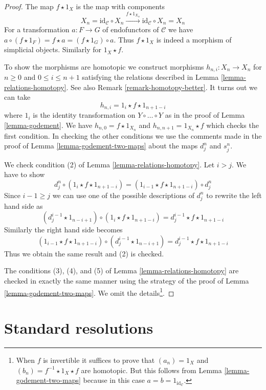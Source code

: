 \begin{proof}
The map $f \star 1_X$ is the map with components
$$
X_n = \text{id}_\mathcal{C} \circ X_n
\xrightarrow{f \star 1_{X_n}}
\text{id}_\mathcal{C} \circ X_n = X_n
$$
For a transformation $a : F \to G$ of endofunctors of $\mathcal{C}$ we have
$a \circ (f \star 1_F) = f \star a = (f \star 1_G) \circ a$. Thus $f \star 1_X$
is indeed a morphism of simplicial objects. Similarly for $1_X \star f$.

\medskip\noindent
To show the morphisms are homotopic we construct
morphisms $h_{n, i} : X_n \to X_n$ for $n \geq 0$ and $0 \leq i \leq n + 1$
satisfying the relations described in Lemma \ref{lemma-relations-homotopy}.
See also Remark \ref{remark-homotopy-better}. It turns out we can take
$$
h_{n, i} = 1_i \star f \star 1_{n + 1 - i}
$$
where $1_i$ is the identity transformation on $Y \circ \ldots \circ Y$
as in the proof of Lemma \ref{lemma-godement}. We have
$h_{n, 0} = f \star 1_{X_n}$ and $h_{n, n + 1} = 1_{X_n} \star f$
which checks the first condition. In checking the other conditions
we use the comments made in the proof of
Lemma \ref{lemma-godement-two-maps} about the maps $d^n_j$ and $s^n_j$.

\medskip\noindent
We check condition (2) of Lemma \ref{lemma-relations-homotopy}.
Let $i > j$. We have to show
$$
d^n_j \circ (1_i \star f \star 1_{n + 1 - i}) =
(1_{i - 1} \star f \star 1_{n + 1 - i}) \circ d^n_j
$$
Since $i - 1 \geq j$ we can use one of the possible descriptions of
$d^n_j$ to rewrite the left hand side as
$$
(d^{i - 1}_j \star 1_{n - i + 1}) \circ (1_i \star f \star 1_{n + 1 - i}) =
d^{i - 1}_j \star f \star 1_{n + 1 - i}
$$
Similarly the right hand side becomes
$$
(1_{i - 1} \star f \star 1_{n + 1 - i}) \circ
(d^{i - 1}_j \star 1_{n - i + 1}) =
d^{i - 1}_j \star f \star 1_{n + 1 - i}
$$
Thus we obtain the same result and (2) is checked.

\medskip\noindent
The conditions (3), (4), and (5) of Lemma \ref{lemma-relations-homotopy}
are checked in exactly the same manner using the strategy of the proof
of Lemma \ref{lemma-godement-two-maps}. We omit the details\footnote{When
$f$ is invertible it suffices to prove that $(a_n) = 1_X$ and
$(b_n) = f^{-1} \star 1_X \star f$ are homotopic.
But this follows from Lemma \ref{lemma-godement-two-maps}
because in this case $a = b = 1_{\text{id}_\mathcal{C}}$.}.
\end{proof}






\section{Standard resolutions}
\label{section-standard}

